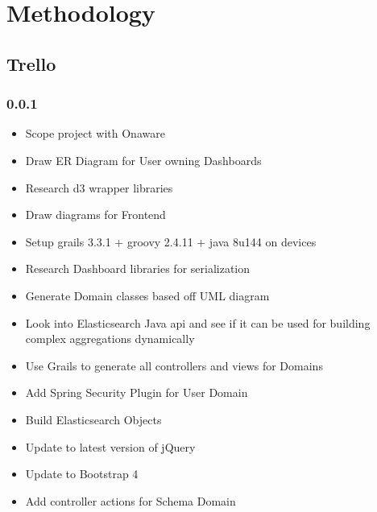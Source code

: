 \documentclass[12pt]{report}
\begin{document}
\chapter{Methodology}
\section{Trello}\subsection*{0.0.1}
\begin{itemize}
\item Scope project with Onaware
\item Draw ER Diagram for User owning Dashboards
\item Research d3 wrapper libraries
\item Draw diagrams for Frontend
\item Setup grails 3.3.1 + groovy 2.4.11 + java 8u144 on devices
\item Research Dashboard libraries for serialization
\item Generate Domain classes based off UML diagram
\item Look into Elasticsearch Java api and see if it can be used for building complex aggregations dynamically
\item Use Grails to generate all controllers and views for Domains
\item Add Spring Security Plugin for User Domain
\item Build Elasticsearch Objects
\item Update to latest version of jQuery
\item Update to Bootstrap 4
\item Add controller actions for Schema Domain
\end{itemize}
\end{document}
